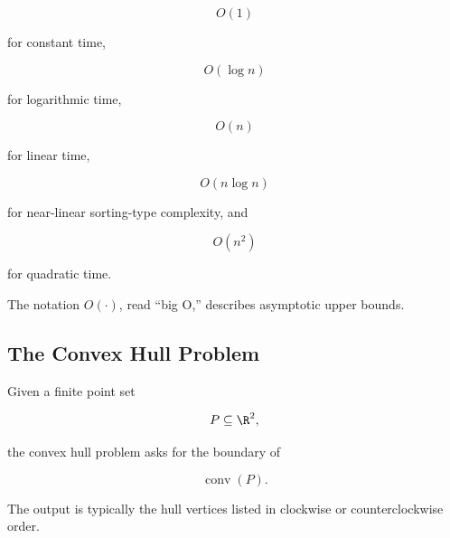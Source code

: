 \[
\boxed{O(1)}
\]

for constant time,

\[
\boxed{O(\log n)}
\]

for logarithmic time,

\[
\boxed{O(n)}
\]

for linear time,

\[
\boxed{O(n\log n)}
\]

for near-linear sorting-type complexity, and

\[
\boxed{O(n^2)}
\]

for quadratic time.

The notation \(O(\cdot)\), read ``big O,'' describes asymptotic upper
bounds.

\subsection{The Convex Hull Problem}
\label{subsec:computational-convex-hull}

Given a finite point set

\[
P\subseteq\R^2,
\]

the convex hull problem asks for the boundary of

\[
\boxed{
\operatorname{conv}(P).
}
\]

The output is typically the hull vertices listed in clockwise or
counterclockwise order.

\begin{centereddiagram}
\end{centereddiagram}


